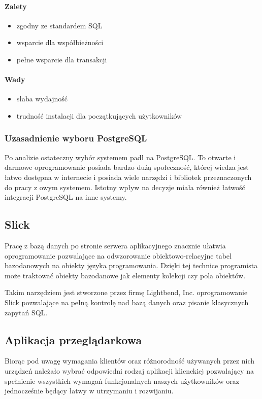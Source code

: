 \documentclass[a4paper,12pt,twoside]{article}
\begin{document}
\paragraph{Zalety}
\begin{itemize}
\item{zgodny ze standardem SQL}
\item{wsparcie dla współbieżności}
\item{pełne wsparcie dla transakcji}
\end{itemize}
\paragraph{Wady}
\begin{itemize}
\item{słaba wydajność}
\item{trudność instalacji dla początkujących użytkowników}
\end{itemize}

\subsubsection{Uzasadnienie wyboru PostgreSQL}
Po analizie ostateczny wybór systemem padł na PostgreSQL.
To otwarte i darmowe oprogramowanie posiada bardzo dużą społeczność, której wiedza jest łatwo dostępna w internecie 
i posiada wiele narzędzi i bibliotek przeznaczonych do pracy z owym systemem. 
Istotny wpływ na decyzje miała również łatwość integracji PostgreSQL na inne systemy.  

\subsection{Slick}  
Pracę z bazą danych po stronie serwera aplikacyjnego 
znacznie ułatwia oprogramowanie pozwalające na odwzorowanie obiektowo-relacyjne tabel bazodanowych na obiekty języka programowania.
Dzięki tej technice programista może traktować obiekty bazodanowe jak elementy kolekcji czy pola obiektów.

Takim narzędziem jest stworzone przez firmę Lightbend, Inc. 
oprogramowanie Slick\cite{slick} pozwalające na pełną kontrolę nad bazą danych oraz pisanie klasycznych zapytań SQL.


\subsection{Aplikacja przeglądarkowa}
Biorąc pod uwagę wymagania klientów oraz różnorodność używanych przez nich urządzeń należało wybrać odpowiedni rodzaj aplikacji klienckiej pozwalający na spełnienie wszystkich wymagań funkcjonalnych naszych użytkowników 
oraz jednocześnie będący łatwy w utrzymaniu i rozwijaniu.
\end{document}
